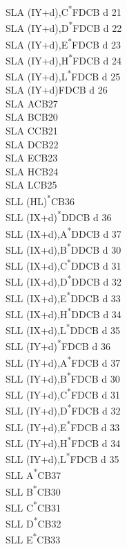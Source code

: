 \documentclass[oneside,a4paper]{book}
\begin{document}
\begin{multicols}{3}
{\begin{tabbing}
SLA (IY+d),C\textsuperscript{*}\>FDCB d 21\\
SLA (IY+d),D\textsuperscript{*}\>FDCB d 22\\
SLA (IY+d),E\textsuperscript{*}\>FDCB d 23\\
SLA (IY+d),H\textsuperscript{*}\>FDCB d 24\\
SLA (IY+d),L\textsuperscript{*}\>FDCB d 25\\
SLA (IY+d)\>FDCB d 26\\
SLA A\>CB27\\
SLA B\>CB20\\
SLA C\>CB21\\
SLA D\>CB22\\
SLA E\>CB23\\
SLA H\>CB24\\
SLA L\>CB25\\
SLL (HL)\textsuperscript{*}\>CB36\\
SLL (IX+d)\textsuperscript{*}\>DDCB d 36\\
SLL (IX+d),A\textsuperscript{*}\>DDCB d 37\\
SLL (IX+d),B\textsuperscript{*}\>DDCB d 30\\
SLL (IX+d),C\textsuperscript{*}\>DDCB d 31\\
SLL (IX+d),D\textsuperscript{*}\>DDCB d 32\\
SLL (IX+d),E\textsuperscript{*}\>DDCB d 33\\
SLL (IX+d),H\textsuperscript{*}\>DDCB d 34\\
SLL (IX+d),L\textsuperscript{*}\>DDCB d 35\\
SLL (IY+d)\textsuperscript{*}\>FDCB d 36\\
SLL (IY+d),A\textsuperscript{*}\>FDCB d 37\\
SLL (IY+d),B\textsuperscript{*}\>FDCB d 30\\
SLL (IY+d),C\textsuperscript{*}\>FDCB d 31\\
SLL (IY+d),D\textsuperscript{*}\>FDCB d 32\\
SLL (IY+d),E\textsuperscript{*}\>FDCB d 33\\
SLL (IY+d),H\textsuperscript{*}\>FDCB d 34\\
SLL (IY+d),L\textsuperscript{*}\>FDCB d 35\\
SLL A\textsuperscript{*}\>CB37\\
SLL B\textsuperscript{*}\>CB30\\
SLL C\textsuperscript{*}\>CB31\\
SLL D\textsuperscript{*}\>CB32\\
SLL E\textsuperscript{*}\>CB33\\

\end{tabbing}}
\end{multicols}
\end{document}
